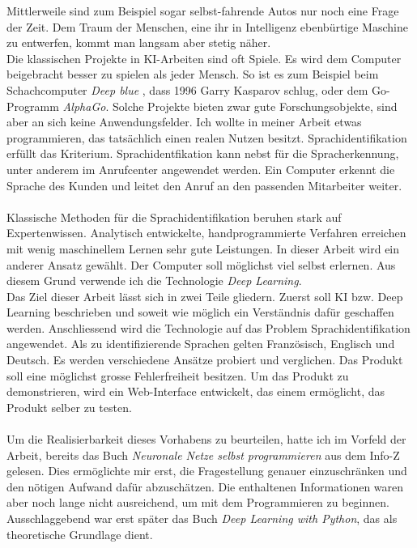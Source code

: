 Mittlerweile sind zum Beispiel sogar selbst-fahrende Autos nur noch eine Frage der Zeit. Dem Traum der Menschen, eine ihr in Intelligenz ebenbürtige Maschine zu entwerfen, kommt man langsam aber stetig näher.
\\
Die klassischen Projekte in KI-Arbeiten sind oft Spiele. Es wird dem Computer beigebracht besser zu spielen als jeder Mensch. So ist es zum Beispiel beim Schachcomputer
\textit{Deep blue}\parencite{deepblue} , dass 1996 Garry Kasparov schlug, oder dem Go-Programm \textit{AlphaGo}\parencite{alphago}.
Solche Projekte bieten zwar gute Forschungsobjekte, sind aber an sich keine Anwendungsfelder. Ich wollte in meiner Arbeit etwas programmieren, das tatsächlich einen realen Nutzen
besitzt.
Sprachidentifikation erfüllt das Kriterium. Sprachidentfikation kann nebst für die Spracherkennung, unter anderem im Anrufcenter angewendet werden. Ein Computer erkennt die Sprache des Kunden und leitet den Anruf an den passenden Mitarbeiter weiter.
\\ \\
Klassische Methoden für die Sprachidentifikation beruhen stark auf Expertenwissen. Analytisch entwickelte, handprogrammierte Verfahren erreichen mit wenig maschinellem Lernen sehr gute Leistungen. In dieser Arbeit wird ein anderer Ansatz gewählt. Der Computer soll möglichst viel selbst erlernen. Aus diesem Grund verwende ich die Technologie \textit{Deep Learning}. 
\\ 
Das Ziel dieser Arbeit lässt sich in zwei Teile gliedern. Zuerst soll KI bzw. Deep Learning beschrieben und soweit wie möglich ein Verständnis dafür geschaffen werden.
Anschliessend wird die Technologie auf das Problem Sprachidentifikation angewendet. Als zu identifizierende Sprachen gelten Französisch, Englisch und Deutsch. Es
werden verschiedene Ansätze probiert und verglichen. Das Produkt soll eine möglichst grosse Fehlerfreiheit besitzen. Um das Produkt zu demonstrieren, wird ein Web-Interface
entwickelt, das einem ermöglicht, das Produkt selber zu testen.
\\ \\
Um die Realisierbarkeit dieses Vorhabens zu beurteilen, hatte ich im Vorfeld der Arbeit, bereits das Buch  \textit{Neuronale Netze selbst programmieren}\parencite{neuronale_netze} aus dem Info-Z gelesen. Dies ermöglichte mir erst, die Fragestellung genauer einzuschränken und den nötigen Aufwand dafür abzuschätzen. Die enthaltenen Informationen waren aber noch lange nicht ausreichend, um mit dem Programmieren zu beginnen. Ausschlaggebend war erst später das Buch \textit{Deep Learning with Python}\parencite{chollet}, das als theoretische Grundlage dient. 
